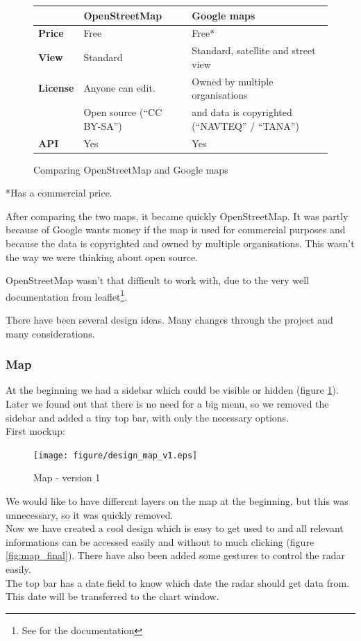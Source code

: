 \begin{figure}[htbp]
\begin{tabular}{| l | l | l |}
\hline
& \textbf{OpenStreetMap} & \textbf{Google maps} \\
\hline
\textbf{Price} & Free & Free* \\
\hline
\textbf{View} & Standard & Standard, satellite and street view \\
\hline
\multirow{1}{*}{\textbf{License}} & Anyone can edit. & Owned by multiple organisations \\ & Open source (``CC BY-SA'') & and data is copyrighted (``NAVTEQ'' / ``TANA'') \\
\hline
\textbf{API} & Yes & Yes \\
\hline
\end{tabular}
\caption{Comparing OpenStreetMap and Google maps}
\end{figure}
*Has a commercial price.

After comparing the two maps, it became quickly OpenStreetMap. It was partly because of Google wants money if the map is used for commercial purposes and because the data is copyrighted and owned by multiple organisations. This wasn't the way we were thinking about open source.

OpenStreetMap wasn't that difficult to work with, due to the very well documentation from leaflet\footnote{See \cite{leaflet} for the documentation}.

There have been several design ideas. Many changes through the project and many considerations.
\subsubsection{Map}
At the beginning we had a sidebar which could be visible or hidden (figure \ref{fig:map_v1}). Later we found out that there is no need for a big menu, so we removed the sidebar and added a tiny top bar, with only the necessary options.\\
First mockup:
\begin{figure}[htbp]
   \centering
   \texttt{[image: figure/design\_map\_v1.eps]}
   \caption{Map - version 1}
   \label{fig:map_v1}
\end{figure}

We would like to have different layers on the map at the beginning, but this was unnecessary, so it was quickly removed.\\
Now we have created a cool design which is easy to get used to and all relevant informations can be accessed easily and without to much clicking (figure \ref{fig:map_final}).
There have also been added some gestures to control the radar easily.\\
The top bar has a date field to know which date the radar should get data from. This date will be transferred to the chart window.

